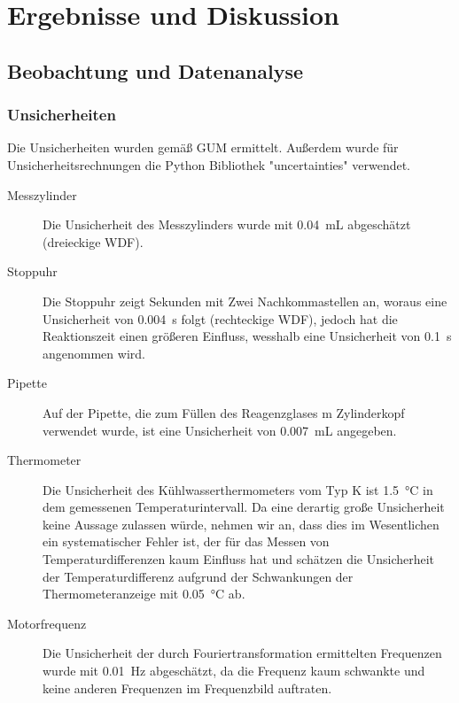 \documentclass[
	a4paper,
	12pt,
	pagesize,
	ngerman
]{scrartcl}
\begin{document}
	\section{Ergebnisse und Diskussion}
	

	\subsection{Beobachtung und Datenanalyse}
	
	\subsubsection{Unsicherheiten} 
	Die Unsicherheiten wurden gemäß GUM ermittelt. 
	Außerdem wurde für Unsicherheitsrechnungen die Python Bibliothek "uncertainties" verwendet.
	\begin{description}
		\item[Messzylinder] Die Unsicherheit des Messzylinders wurde mit \SI{0,04}{mL} abgeschätzt (dreieckige WDF).
		\item[Stoppuhr] Die Stoppuhr zeigt Sekunden mit Zwei Nachkommastellen an, woraus eine Unsicherheit von \SI{0,004}{s} folgt (rechteckige WDF), jedoch hat die Reaktionszeit einen größeren Einfluss, wesshalb eine Unsicherheit von \SI{0,1}{s} angenommen wird. 
		\item[Pipette] Auf der Pipette, die zum Füllen des Reagenzglases m Zylinderkopf verwendet wurde, ist eine Unsicherheit von \SI{0,007}{mL} angegeben.
		\item[Thermometer] Die Unsicherheit des Kühlwasserthermometers vom Typ K ist \SI{1,5}{\degreeCelsius} in dem gemessenen Temperaturintervall. Da eine derartig große Unsicherheit keine Aussage zulassen würde, nehmen wir an, dass dies im Wesentlichen ein systematischer Fehler ist, der  für das Messen von Temperaturdifferenzen kaum Einfluss hat und schätzen die Unsicherheit der Temperaturdifferenz aufgrund der Schwankungen der Thermometeranzeige mit \SI{0,05}{\degreeCelsius} ab. %
		\item[Motorfrequenz] Die Unsicherheit der durch Fouriertransformation ermittelten Frequenzen wurde mit \SI{0,01}{Hz} abgeschätzt, da die Frequenz kaum schwankte und keine anderen Frequenzen im Frequenzbild auftraten.
	
	\end{description}
\end{document}
